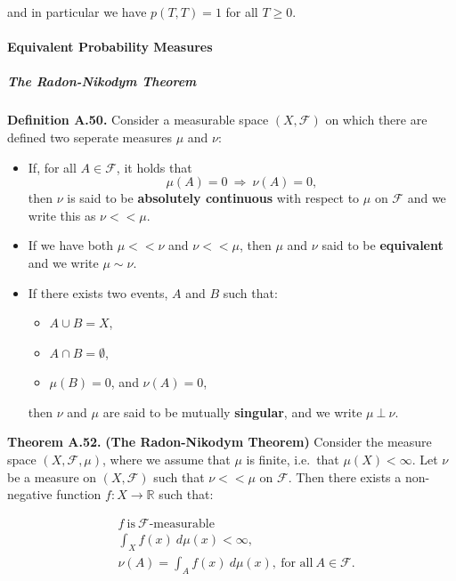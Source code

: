 \documentclass[
]{article}
\providecommand{\tightlist}{%
  \setlength{\itemsep}{0pt}\setlength{\parskip}{0pt}}
\begin{document}
and in particular we have \(p(T,T)=1\) for all \(T\ge 0\).

\hypertarget{equivalent-probability-measures}{%
\paragraph{Equivalent Probability
Measures}\label{equivalent-probability-measures}}

\hypertarget{the-radon-nikodym-theorem}{%
\subparagraph{The Radon-Nikodym
Theorem}\label{the-radon-nikodym-theorem}}

\textbf{Definition A.50.} Consider a measurable space
\((X,\mathcal{F})\) on which there are defined two seperate measures
\(\mu\) and \(\nu\):

\begin{itemize}
\item
  If, for all \(A\in \mathcal{F}\), it holds that \[
    \mu(A)=0\ \Rightarrow\ \nu(A)=0,
    \] then \(\nu\) is said to be \textbf{absolutely continuous} with
  respect to \(\mu\) on \(\mathcal{F}\) and we write this as
  \(\nu < < \mu\).
\item
  If we have both \(\mu << \nu\) and \(\nu << \mu\), then \(\mu\) and
  \(\nu\) said to be \textbf{equivalent} and we write \(\mu\sim \nu\).
\item
  If there exists two events, \(A\) and \(B\) such that:

  \begin{itemize}
  \tightlist
  \item
    \(A\cup B=X\),
  \item
    \(A\cap B=\emptyset\),
  \item
    \(\mu(B)=0\), and \(\nu(A)=0\),
  \end{itemize}

  then \(\nu\) and \(\mu\) are said to be mutually \textbf{singular},
  and we write \(\mu\ \bot\ \nu\).
\end{itemize}

\textbf{Theorem A.52.} \textbf{(The Radon-Nikodym Theorem)} Consider the
measure space \((X,\mathcal{F},\mu)\), where we assume that \(\mu\) is
finite, i.e.~that \(\mu(X)<\infty\). Let \(\nu\) be a measure on
\((X,\mathcal{F})\) such that \(\nu <<\mu\) on \(\mathcal{F}\). Then
there exists a non-negative function \(f : X\to \mathbb{R}\) such that:

\begin{align*}
&f\ \text{is}\ \mathcal{F}\text{-measurable}\\
&\int_X f(x)\ d\mu(x)<\infty,\\
&\nu(A)=\int_Af(x)\ d\mu(x),\ \text{for all}\ A\in \mathcal{F}.
\end{align*}
\end{document}
